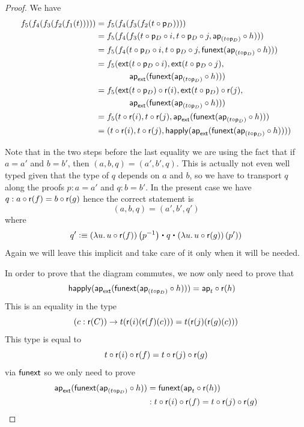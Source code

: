 \begin{proof}
  We have
  \begin{align*}
    f_5(f_4(f_3(f_2(f_1(t))))) &= f_5(f_4(f_3(f_2(t\circ\mathsf{p}_D)))) \\
    &= f_5(f_4(f_3(t\circ\mathsf{p}_D\circ{}i,t\circ\mathsf{p}_D\circ{}j,
    \mathsf{ap}_{(t\circ\mathsf{p}_D)}\circ{}h))) \\
    &=f_5(f_4(t\circ\mathsf{p}_D\circ{}i,t\circ\mathsf{p}_D\circ{}j,
    \mathsf{funext}(\mathsf{ap}_{(t\circ\mathsf{p}_D)}\circ{}h))) \\
    &=f_5(\mathsf{ext}(t\circ\mathsf{p}_D\circ{}i),\mathsf{ext}(t\circ\mathsf{p}_D\circ{}j),\\
    &\qquad\qquad\mathsf{ap}_{\mathsf{ext}}(\mathsf{funext}(\mathsf{ap}_{(t\circ\mathsf{p}_D)}\circ{}h)))
    \\
    &=f_5(\mathsf{ext}(t\circ\mathsf{p}_D)\circ\mathsf{r}(i),
    \mathsf{ext}(t\circ\mathsf{p}_D)\circ\mathsf{r}(j),\\
    &\qquad\qquad\mathsf{ap}_{\mathsf{ext}}(\mathsf{funext}(\mathsf{ap}_{(t\circ\mathsf{p}_D)}\circ{}h)))
    \\
    &=f_5(t\circ\mathsf{r}(i),
    t\circ\mathsf{r}(j),
    \mathsf{ap}_{\mathsf{ext}}(\mathsf{funext}(\mathsf{ap}_{(t\circ\mathsf{p}_D)}\circ{}h))) \\
    &=(t\circ\mathsf{r}(i),t\circ\mathsf{r}(j),
    \mathsf{happly}(\mathsf{ap}_{\mathsf{ext}}(\mathsf{funext}(\mathsf{ap}_{(t\circ\mathsf{p}_D)}\circ{}h))))
  \end{align*}

  Note that in the two steps before the last equality we are using the fact
  that if $a=a'$ and $b=b'$, then $(a,b,q)=(a',b',q)$. This is actually not
  even well typed given that the type of $q$ depends on $a$ and $b$, so we
  have to transport $q$ along the proofs $p:a=a'$ and $q:b=b'$. In the present
  case we have $q:a\circ\mathsf{r}(f)=b\circ\mathsf{r}(g)$ hence the correct
  statement is
  \[(a,b,q)=(a',b',q')\] where
  \[q'\defeq\map{(\lambda{}u.\,u\circ\reflect(f))}{\rev p} \ct q \ct
  \map{(\lambda{}u.\,u\circ\reflect(g))}{p'})\] Again we will leave this
  implicit and take care of it only when it will be needed.

  \bigskip

  In order to prove that the diagram commutes, we now only need to prove that
  \begin{align*}
    \mathsf{happly}(\mathsf{ap}_{\mathsf{ext}}(\mathsf{funext}(\mathsf{ap}_{(t\circ\mathsf{p}_D)}\circ{}h))) &=
    \mathsf{ap}_{t}\circ\mathsf{r}(h)
  \end{align*}
  This is an equality in the type
  \[(c:\mathsf{r}(C))\to{}t(\mathsf{r}(i)(\mathsf{r}(f)(c)))=
  t(\mathsf{r}(j)(\mathsf{r}(g)(c)))\]
  This type is equal to
  \[t\circ\mathsf{r}(i)\circ\mathsf{r}(f) = t\circ\mathsf{r}(j)\circ\mathsf{r}(g)\]
  via $\mathsf{funext}$ so we only need to prove
  \begin{align*}
    \mathsf{ap}_{\mathsf{ext}}(\mathsf{funext}(\mathsf{ap}_{(t\circ\mathsf{p}_D)}\circ{}h)) &=
    \mathsf{funext}(\mathsf{ap}_{t}\circ\mathsf{r}(h)) \\
    &: t\circ\mathsf{r}(i)\circ\mathsf{r}(f) =
    t\circ\mathsf{r}(j)\circ\mathsf{r}(g)
  \end{align*}


\end{proof}
